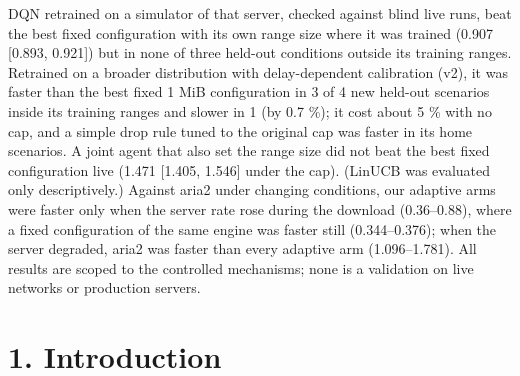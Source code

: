\documentclass[10pt,a4paper]{article}
\begin{document}
DQN retrained on a simulator of that server, checked against blind live runs, beat the best fixed configuration with its own range size where it was trained (0.907 [0.893, 0.921]) but in none of three held-out conditions outside its training ranges. Retrained on a broader distribution with delay-dependent calibration (v2), it was faster than the best fixed 1 MiB configuration in 3 of 4 new held-out scenarios inside its training ranges and slower in 1 (by 0.7 \%); it cost about 5 \% with no cap, and a simple drop rule tuned to the original cap was faster in its home scenarios. A joint agent that also set the range size did not beat the best fixed configuration live (1.471 [1.405, 1.546] under the cap). (LinUCB was evaluated only descriptively.) Against aria2 under changing conditions, our adaptive arms were faster only when the server rate rose during the download (0.36–0.88), where a fixed configuration of the same engine was faster still (0.344–0.376); when the server degraded, aria2 was faster than every adaptive arm (1.096–1.781). All results are scoped to the controlled mechanisms; none is a validation on live networks or production servers.



\section*{1. Introduction}
\end{document}
